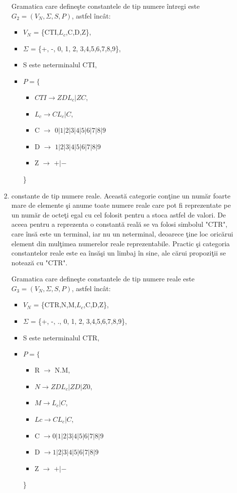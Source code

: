 \begin{enumerate}
\begin{enumerate}
Gramatica care defineşte constantele de tip numere întregi este $G_2 = (V_{N}, \Sigma, S, P)$, astfel încât:

\begin{itemize}
\item
$V_{N}$ = \{CTI,$L_c$,C,D,Z\},
\item
$\Sigma$ = \{+, -, 0, 1, 2, 3,4,5,6,7,8,9\},
\item
S este neterminalul CTI,
\item
$P = \{$
\begin{itemize}
\item
$CTI \rightarrow ZDL_c | ZC$,
\item
$L_c \rightarrow CL_c | C$,
\item
C $\rightarrow$ $0|1|2|3|4|5|6|7|8|9$
\item
D $\rightarrow$ $1|2|3|4|5|6|7|8|9$
\item
Z $\rightarrow$  $+|-$
\end{itemize}
\}
\end{itemize}

\item
constante de tip numere reale. Această categorie conţine un număr foarte mare de elemente şi anume toate numere reale care pot fi reprezentate pe un număr de octeţi egal cu cel folosit pentru a stoca astfel de valori. De aceea pentru a reprezenta o constantă reală se va folosi simbolul "CTR", care însă este un terminal, iar nu un neterminal, deoarece ţine loc oricărui element din mulţimea numerelor reale reprezentabile. Practic şi categoria constantelor reale este ea însăşi un limbaj în sine, ale cărui propoziţii se notează cu "CTR".

Gramatica care defineşte constantele de tip numere reale este $G_3 = (V_{N}, \Sigma, S, P)$, astfel încât:

\begin{itemize}
\item
$V_{N}$ = \{CTR,N,M,$L_c$,C,D,Z\},
\item
$\Sigma$ = \{+, -, ., 0, 1, 2, 3,4,5,6,7,8,9\},
\item
S este neterminalul CTR,
\item
$P = \{$
\begin{itemize}
\item
R $\rightarrow$  N.M,
\item
$N \rightarrow ZDL_c | ZD | Z0$,
\item
$M \rightarrow L_c |C$,
\item
$Lc \rightarrow CL_c | C$,
\item
C $\rightarrow 0|1|2|3|4|5|6|7|8|9$
\item
D $\rightarrow 1|2|3|4|5|6|7|8|9$
\item
Z $\rightarrow$  $+|-$
\end{itemize}
\}
\end{itemize}

\end{enumerate}
\end{enumerate}

